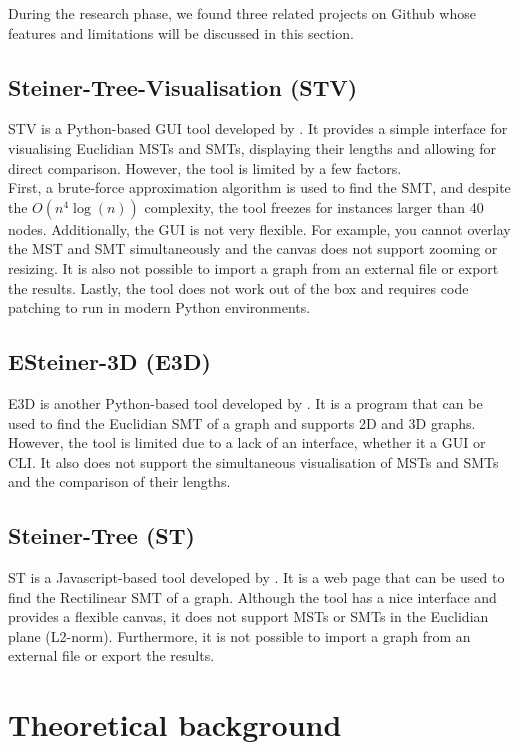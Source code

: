 \documentclass{l4proj}
\begin{document}
During the research phase, we found three related projects on Github whose features and limitations will be discussed in this section.

\subsection{Steiner-Tree-Visualisation (STV)}
STV is a Python-based GUI tool developed by \cite{Steiner-Tree-Visualisation}. It provides a simple interface for visualising Euclidian MSTs and SMTs, displaying their lengths and allowing for direct comparison. However, the tool is limited by a few factors.
\\
First, a brute-force approximation algorithm is used to find the SMT, and despite the ${O(n^4 \log(n))}$ complexity, the tool freezes for instances larger than 40 nodes.
Additionally, the GUI is not very flexible. For example, you cannot overlay the MST and SMT simultaneously and the canvas does not support zooming or resizing. It is also not possible to import a graph from an external file or export the results.
Lastly, the tool does not work out of the box and requires code patching to run in modern Python environments.

\subsection{ESteiner-3D (E3D)}
E3D is another Python-based tool developed by \cite{ESteiner-3D}. It is a program that can be used to find the Euclidian SMT of a graph and supports 2D and 3D graphs. However, the tool is limited due to a lack of an interface, whether it a GUI or CLI. It also does not support the simultaneous visualisation of MSTs and SMTs and the comparison of their lengths.

\subsection{Steiner-Tree (ST)}
ST is a Javascript-based tool developed by \cite{Steiner-Tree}. It is a web page that can be used to find the Rectilinear SMT of a graph. Although the tool has a nice interface and provides a flexible canvas, it does not support MSTs or SMTs in the Euclidian plane (L2-norm). Furthermore, it is not possible to import a graph from an external file or export the results.

\section{Theoretical background}
\end{document}
